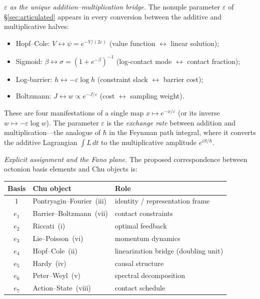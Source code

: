 \begin{remark}
\medskip\noindent\emph{$\varepsilon$ as the unique
addition--multiplication bridge.}
The nonuple parameter $\varepsilon$ of \S\ref{sec:articulated}
appears in every conversion between the additive and multiplicative
halves:
\begin{itemize}[nosep]
\item Hopf--Cole: $V \leftrightarrow \psi = e^{-V/(2\varepsilon)}$
  (value function $\leftrightarrow$ linear solution);
\item Sigmoid: $\beta \leftrightarrow \sigma =
  (1 + e^{-\beta})^{-1}$
  (log-contact mode $\leftrightarrow$ contact fraction);
\item Log-barrier: $h \leftrightarrow -\varepsilon\log h$
  (constraint slack $\leftrightarrow$ barrier cost);
\item Boltzmann: $J \leftrightarrow w \propto e^{-J/\varepsilon}$
  (cost $\leftrightarrow$ sampling weight).
\end{itemize}
These are four manifestations of a single map
$x \mapsto e^{-x/\varepsilon}$ (or its inverse
$w \mapsto -\varepsilon \log w$).
The parameter $\varepsilon$ is the \emph{exchange rate} between
addition and multiplication---the analogue of $\hbar$ in the
Feynman path integral, where it converts the additive Lagrangian
$\int L\,dt$ to the multiplicative amplitude $e^{iS/\hbar}$.

\medskip\noindent\emph{Explicit assignment and the Fano plane.}
The proposed correspondence between octonion basis elements and
Chu objects is:

\begin{center}
\small
\begin{tabular}{cll}
\hline
Basis & Chu object & Role \\
\hline
$1$ & Pontryagin--Fourier~(iii) & identity / representation frame \\
$e_1$ & Barrier--Boltzmann~(vii) & contact constraints \\
$e_2$ & Riccati~(i) & optimal feedback \\
$e_3$ & Lie--Poisson~(vi) & momentum dynamics \\
$e_4$ & Hopf--Cole~(ii) & linearization bridge (doubling unit) \\
$e_5$ & Hardy~(iv) & causal structure \\
$e_6$ & Peter--Weyl~(v) & spectral decomposition \\
$e_7$ & Action--State~(viii) & contact schedule \\
\hline
\end{tabular}
\end{center}


\end{remark}
